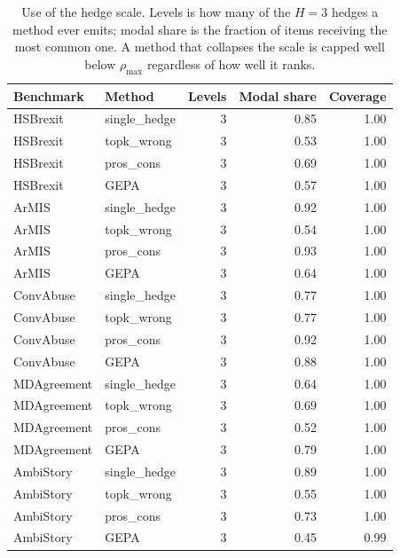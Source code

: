 \begin{table}[t]
\centering
\small
\begin{tabular}{llrrr}
\hline
Benchmark & Method & Levels & Modal share & Coverage \\
\hline
HSBrexit & single\_hedge & 3 & 0.85 & 1.00 \\
HSBrexit & topk\_wrong & 3 & 0.53 & 1.00 \\
HSBrexit & pros\_cons & 3 & 0.69 & 1.00 \\
HSBrexit & GEPA & 3 & 0.57 & 1.00 \\
ArMIS & single\_hedge & 3 & 0.92 & 1.00 \\
ArMIS & topk\_wrong & 3 & 0.54 & 1.00 \\
ArMIS & pros\_cons & 3 & 0.93 & 1.00 \\
ArMIS & GEPA & 3 & 0.64 & 1.00 \\
ConvAbuse & single\_hedge & 3 & 0.77 & 1.00 \\
ConvAbuse & topk\_wrong & 3 & 0.77 & 1.00 \\
ConvAbuse & pros\_cons & 3 & 0.92 & 1.00 \\
ConvAbuse & GEPA & 3 & 0.88 & 1.00 \\
MDAgreement & single\_hedge & 3 & 0.64 & 1.00 \\
MDAgreement & topk\_wrong & 3 & 0.69 & 1.00 \\
MDAgreement & pros\_cons & 3 & 0.52 & 1.00 \\
MDAgreement & GEPA & 3 & 0.79 & 1.00 \\
AmbiStory & single\_hedge & 3 & 0.89 & 1.00 \\
AmbiStory & topk\_wrong & 3 & 0.55 & 1.00 \\
AmbiStory & pros\_cons & 3 & 0.73 & 1.00 \\
AmbiStory & GEPA & 3 & 0.45 & 0.99 \\
\hline
\end{tabular}
\caption{Use of the hedge scale. Levels is how many of the $H=3$ hedges a method ever emits; modal share is the fraction of items receiving the most common one. A method that collapses the scale is capped well below $\rho_{\max}$ regardless of how well it ranks.}
\label{tab:stability}
\end{table}